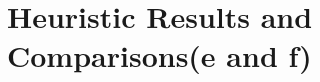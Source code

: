 
\section{Heuristic Results and Comparisons(e and f)}
\newcommand{\ucstime}{21.9412 ms}
\newcommand{\ucsnode}{12907}
\newcommand{\ucslength}{179.66}


\newcommand{\aStarHOnetime}{21.6008 ms}
\newcommand{\aStarHOnenode}{10374}
\newcommand{\aStarHOnelength}{0.000  \%}

\newcommand{\aStarHTwotime}{2.9807 ms}
\newcommand{\aStarHTwonode}{460}
\newcommand{\aStarHTwolength}{-5.755  \%}

\newcommand{\aStarHThreetime}{0.9796 ms}
\newcommand{\aStarHThreenode}{217}
\newcommand{\aStarHThreelength}{-28.877 \%}

\newcommand{\aStarHFourtime}{1.8209 ms}
\newcommand{\aStarHFournode}{754}
\newcommand{\aStarHFourlength}{-16.932 \%}

\newcommand{\aStarHFivetime}{3.3776 ms}
\newcommand{\aStarHFivenode}{1660}
\newcommand{\aStarHFivelength}{-15.886 \%}


\newcommand{\aStarWeightedHOnetime}{23.4999 ms}
\newcommand{\aStarWeightedHOnenode}{9486}
\newcommand{\aStarWeightedHOnelength}{-1.747  \%}

\newcommand{\aStarWeightedHTwotime}{4.2639 ms}
\newcommand{\aStarWeightedHTwonode}{417}
\newcommand{\aStarWeightedHTwolength}{-4.386  \%}

\newcommand{\aStarWeightedHThreetime}{1.9081 ms}
\newcommand{\aStarWeightedHThreenode}{136}
\newcommand{\aStarWeightedHThreelength}{ -33.074 \%}

\newcommand{\aStarWeightedHFourtime}{1.4664 ms}
\newcommand{\aStarWeightedHFournode}{288}
\newcommand{\aStarWeightedHFourlength}{-30.669 \%}

\newcommand{\aStarWeightedHFivetime}{0.9395 ms}
\newcommand{\aStarWeightedHFivenode}{376}
\newcommand{\aStarWeightedHFivelength}{-22.821 \%}

\newcommand{\aStarWeightedTwoHOnetime}{14.2124 ms}
\newcommand{\aStarWeightedTwoHOnenode}{6773}
\newcommand{\aStarWeightedTwoHOnelength}{-5.143 \%}

\newcommand{\aStarWeightedTwoHTwotime}{2.0119 ms}
\newcommand{\aStarWeightedTwoHTwonode}{398}
\newcommand{\aStarWeightedTwoHTwolength}{ 0.256 \%}

\newcommand{\aStarWeightedTwoHThreetime}{0.4456 ms}
\newcommand{\aStarWeightedTwoHThreenode}{120}
\newcommand{\aStarWeightedTwoHThreelength}{ -34.220\%}

